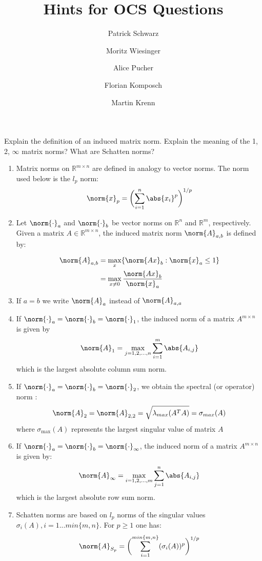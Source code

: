\documentclass[12pt,a4paper]{article}
\title{Hints for OCS Questions}
\author{ Patrick Schwarz 
    \and Moritz Wiesinger
    \and Alice Pucher
    \and Florian Komposch
    \and Martin Krenn
    }
\begin{document}
\maketitle

\begin{question}
Explain the definition of an induced matrix norm. Explain the meaning of the 1, 2, $\infty$ matrix norms? What are Schatten norms?
\end{question}

\begin{enumerate}[(1)]
    \item Matrix norms on $ \mathbb{R}^{m \times n}$ are defined in analogy to vector norms. The norm used below is the $l_p$ norm:
    \begin{equation*}
     \norm{x}_p = \biggl( \sum_{i=1}^n \abs{x_i}^p \biggr)^{1/p}
    \end{equation*}
    \item Let $ \norm{\cdot}_a$ and $ \norm{\cdot}_b$ be vector norms on $\mathbb{R}^n$ and $\mathbb{R}^m$, respectively. Given a matrix $A\in\mathbb{R}^{m \times n}$, the induced matrix norm $\norm{A}_{a,b}$ is defined by:
    
    \begin{align}
    \norm{A}_{a,b} &= \max_x\{\norm{Ax}_b : \norm{x}_a \leq 1\}\\  &= \max_{x\neq 0} \frac{\norm{Ax}_b}{\norm{x}_a}
    \end{align}
    \item If $a=b$ we write $\norm{A}_a$ instead of $\norm{A}_{a,a}$ 
    \item If  $ \norm{\cdot}_a = \norm{\cdot}_b = \norm{\cdot}_1$, the induced norm of a matrix $A^{m \times n}$ is given by 
    \begin{equation*}
    \norm{A}_1 = \max_{j=1,2,...,n} \sum_{i=1}^m \abs{A_{i,j}} 
    \end{equation*}
    which is the largest absolute column sum norm.
    \item If  $ \norm{\cdot}_a = \norm{\cdot}_b = \norm{\cdot}_2$, we obtain the spectral (or operator) norm :
    \begin{equation*}
    \norm{A}_2 = \norm{A}_{2,2} = \sqrt{\lambda_{max}(A^TA)} = \sigma_{max}(A) 
    \end{equation*}
    where $ \sigma _{\max }(A)$ represents the largest singular value of matrix $A$
    \item If  $ \norm{\cdot}_a = \norm{\cdot}_b = \norm{\cdot}_{\infty}$, the induced norm of a matrix $A^{m \times n}$ is given by:
    \begin{equation*}
    \norm{A}_{\infty} = \max_{i=1,2,...,m} \sum_{j=1}^n \abs{A_{i,j}} 
    \end{equation*}
    which is the largest absolute row sum norm.
    \item Schatten norms are based on $l_p$ norms of the singular values $\sigma_i(A), i = 1...min\{m,n\}$. For $p\geq 1 $ one has:
    \begin{equation*}
    \norm{A}_{S_p} = \biggl(\sum_{i=1}^{min\{m,n\}} (\sigma_i(A))^p\biggr) ^{1/p}
    \end{equation*}
\end{enumerate}
\end{document}
